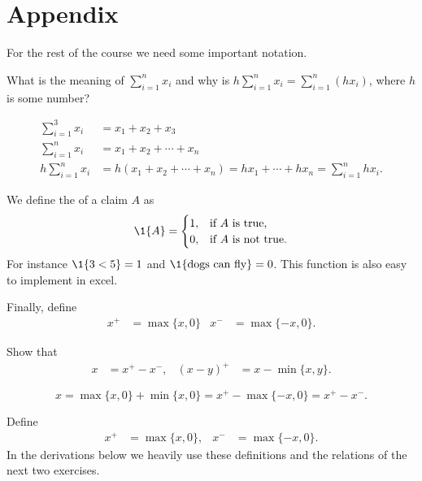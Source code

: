 \section{Appendix}
\label{sec:appendix}


For the rest of the course we need some important notation. 
\begin{exercise}
What is the meaning of $\sum_{i=1}^n x_i$ and why is $h \sum_{i=1}^n x_i = \sum_{i=1}^n (h x_i)$, where $h$ is some number?
  \begin{solution}
    \begin{align*}
      \sum_{i=1}^3 x_i &= x_1 + x_2 + x_3 \\
      \sum_{i=1}^n x_i &= x_1 + x_2 + \cdots +x_n \\
     h \sum_{i=1}^n x_i &= h(x_1 + x_2 + \cdots +x_n) = h x_1 + \cdots + h x_n = \sum_{i=1}^n h x_i.
    \end{align*}
  \end{solution}
\end{exercise}

We define the  of a claim $A$ as
  \begin{equation*}
    \1{A} =
    \begin{cases}
      1, & \text{if $A$ is true},\\
      0, & \text{if $A$ is not true}.
    \end{cases}
  \end{equation*}
For instance $\1{3<5} = 1$ and $\1{\text{dogs can fly}} = 0$. This function is also easy to implement in excel.

Finally, define
\begin{align}
 x^+ &= \max\{x, 0\} & x^- &= \max\{-x, 0\}.
\end{align}

\begin{exercise}
  Show that 
  \begin{align*}
 x  &= x^+ - x^-, & (x-y)^+ &= x - \min\{x, y\}.
  \end{align*}
  \begin{solution}
    \begin{equation*}
      x = \max\{x, 0\} + \min\{x, 0\} = x^+ - \max\{-x, 0\} = x^+ - x^-.
    \end{equation*}
  \end{solution}
\end{exercise}


Define 
\begin{align}\label{eq:3}
 x^+&=\max\{x,0\}, & x^-&=\max\{-x,0\}.
\end{align}
In the derivations below we heavily use these definitions and the relations of the next two exercises.

